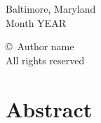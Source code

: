 \vspace{0.5in}
\begin{center}
    Baltimore, Maryland \\          %
    Month YEAR                      %

    \vspace{0.25 in}
    
    \copyright\ Author name \\      %
    All rights reserved 
\end{center}





\clearpage 
{}
\setcounter{page}{2}
\MainTextSpacing
{}
\section*{Abstract}

\blindtext






{
\clearpage
\TOCTextSpacing                               %
\hypersetup{linkcolor=black}                  %
\renewcommand{\contentsname}{Table of Contents \vspace{3pt} \hrule}
\tableofcontents

\clearpage {}
{}
\renewcommand{\listfigurename}{List of Figures \vspace{3pt} \hrule}
\listoffigures

\clearpage {}
{}
\renewcommand{\listtablename}{List of Tables \vspace{3pt} \hrule}
\listoftables
}

